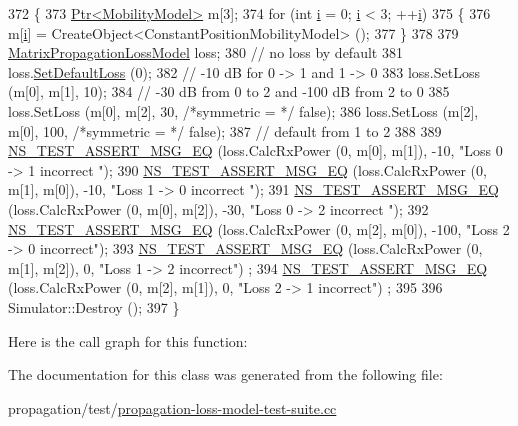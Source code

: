 \begin{DoxyCode}
372 \{
373   \hyperlink{classns3_1_1Ptr}{Ptr<MobilityModel>} m[3];
374   \textcolor{keywordflow}{for} (\textcolor{keywordtype}{int} \hyperlink{bernuolliDistribution_8m_a6f6ccfcf58b31cb6412107d9d5281426}{i} = 0; \hyperlink{bernuolliDistribution_8m_a6f6ccfcf58b31cb6412107d9d5281426}{i} < 3; ++\hyperlink{bernuolliDistribution_8m_a6f6ccfcf58b31cb6412107d9d5281426}{i})
375     \{
376       m[\hyperlink{bernuolliDistribution_8m_a6f6ccfcf58b31cb6412107d9d5281426}{i}] = CreateObject<ConstantPositionMobilityModel> ();
377     \}
378 
379   \hyperlink{classns3_1_1MatrixPropagationLossModel}{MatrixPropagationLossModel} loss;
380   \textcolor{comment}{// no loss by default}
381   loss.\hyperlink{classns3_1_1MatrixPropagationLossModel_a18c185657dd9025daf37558d16b6cee9}{SetDefaultLoss} (0);
382   \textcolor{comment}{// -10 dB for 0 -> 1 and 1 -> 0}
383   loss.SetLoss (m[0], m[1], 10);
384   \textcolor{comment}{// -30 dB from 0 to 2 and -100 dB from 2 to 0}
385   loss.SetLoss (m[0], m[2], 30, \textcolor{comment}{/*symmetric = */} \textcolor{keyword}{false});
386   loss.SetLoss (m[2], m[0], 100, \textcolor{comment}{/*symmetric = */} \textcolor{keyword}{false});
387   \textcolor{comment}{// default from 1 to 2}
388 
389   \hyperlink{group__testing_ga2a9d78cffb3db8e867c35fff0b698cf5}{NS\_TEST\_ASSERT\_MSG\_EQ} (loss.CalcRxPower (0, m[0], m[1]), -10, \textcolor{stringliteral}{"Loss 0 -> 1 incorrect
      "});
390   \hyperlink{group__testing_ga2a9d78cffb3db8e867c35fff0b698cf5}{NS\_TEST\_ASSERT\_MSG\_EQ} (loss.CalcRxPower (0, m[1], m[0]), -10, \textcolor{stringliteral}{"Loss 1 -> 0 incorrect
      "});
391   \hyperlink{group__testing_ga2a9d78cffb3db8e867c35fff0b698cf5}{NS\_TEST\_ASSERT\_MSG\_EQ} (loss.CalcRxPower (0, m[0], m[2]), -30, \textcolor{stringliteral}{"Loss 0 -> 2 incorrect
      "});
392   \hyperlink{group__testing_ga2a9d78cffb3db8e867c35fff0b698cf5}{NS\_TEST\_ASSERT\_MSG\_EQ} (loss.CalcRxPower (0, m[2], m[0]), -100, \textcolor{stringliteral}{"Loss 2 -> 0
       incorrect"});
393   \hyperlink{group__testing_ga2a9d78cffb3db8e867c35fff0b698cf5}{NS\_TEST\_ASSERT\_MSG\_EQ} (loss.CalcRxPower (0, m[1], m[2]), 0, \textcolor{stringliteral}{"Loss 1 -> 2 incorrect"})
      ;
394   \hyperlink{group__testing_ga2a9d78cffb3db8e867c35fff0b698cf5}{NS\_TEST\_ASSERT\_MSG\_EQ} (loss.CalcRxPower (0, m[2], m[1]), 0, \textcolor{stringliteral}{"Loss 2 -> 1 incorrect"})
      ;
395 
396   Simulator::Destroy ();
397 \}
\end{DoxyCode}


Here is the call graph for this function\+:




The documentation for this class was generated from the following file\+:\begin{DoxyCompactItemize}
\item 
propagation/test/\hyperlink{propagation-loss-model-test-suite_8cc}{propagation-\/loss-\/model-\/test-\/suite.\+cc}\end{DoxyCompactItemize}
